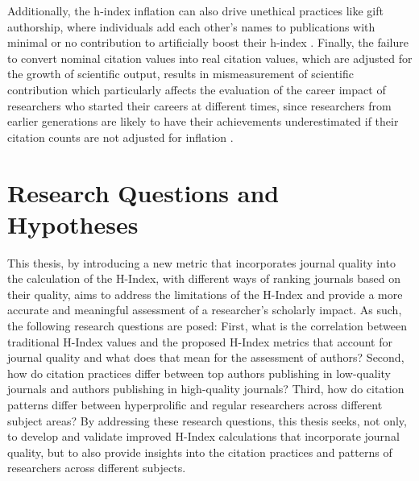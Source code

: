 Additionally, the h-index inflation can also drive unethical practices like
gift authorship, where individuals add each other’s names to publications with
minimal or no contribution to artificially boost their h-index
\cite{bi2023four}. Finally, the failure to convert nominal citation values into
real citation values, which are adjusted for the growth of scientific output,
results in mismeasurement of scientific contribution which particularly affects
the evaluation of the career impact of researchers who started their careers at
different times, since researchers from earlier generations are likely to have
their achievements underestimated if their citation counts are not adjusted for
inflation \cite{petersen2019methods}.

\section{Research Questions and Hypotheses}
This thesis, by introducing a new metric that incorporates journal quality into
the calculation of the H-Index, with different ways of ranking journals based
on their quality, aims to address the limitations of the H-Index and provide a
more accurate and meaningful assessment of a researcher's scholarly impact. As
such, the following research questions are posed: First, what is the
correlation between traditional H-Index values and the proposed H-Index metrics
that account for journal quality and what does that mean for the assessment of
authors? Second, how do citation practices differ between top authors
publishing in low-quality journals and authors publishing in high-quality
journals? Third, how do citation patterns differ between hyperprolific and
regular researchers across different subject areas? By addressing these
research questions, this thesis seeks, not only, to develop and validate
improved H-Index calculations that incorporate journal quality, but to also
provide insights into the citation practices and patterns of researchers across
different subjects.
